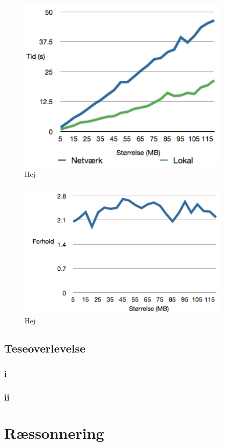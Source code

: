\documentclass{article}
\begin{document}
\begin{figure}
	\includegraphics[width=4in]{ploto.png}
	\caption{Hej}
	\label{ploto}
\end{figure}

\begin{figure}
	\includegraphics[width=4in]{plotforhold.png}
	\caption{Hej}
	\label{plotforhold}
\end{figure}

\subsection{Teseoverlevelse}

\subsubsection{i}

\subsubsection{ii}

\section{Ræssonnering}
\end{document}

